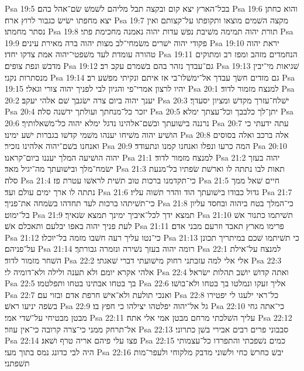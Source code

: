 Psa 19:5  בכל־הארץ יצא קום ובקצה תבל מליהם לשׁמשׁ שׂם־אהל בהם׃
Psa 19:6  והוא כחתן יצא מחפתו ישׂישׂ כגבור לרוץ ארח׃
Psa 19:7  מקצה השׁמים מוצאו ותקופתו על־קצותם ואין נסתר מחמתו׃
Psa 19:8  תורת יהוה תמימה משׁיבת נפשׁ עדות יהוה נאמנה מחכימת פתי׃
Psa 19:9  פקודי יהוה ישׁרים משׂמחי־לב מצות יהוה ברה מאירת עינים׃
Psa 19:10  יראת יהוה טהורה עומדת לעד משׁפטי־יהוה אמת צדקו יחדו׃
Psa 19:11  הנחמדים מזהב ומפז רב ומתוקים מדבשׁ ונפת צופים׃
Psa 19:12  גם־עבדך נזהר בהם בשׁמרם עקב רב׃
Psa 19:13  שׁגיאות מי־יבין מנסתרות נקני׃
Psa 19:14  גם מזדים חשׂך עבדך אל־ימשׁלו־בי אז איתם ונקיתי מפשׁע רב׃
Psa 19:15  יהיו לרצון אמרי־פי והגיון לבי לפניך יהוה צורי וגאלי׃
Psa 20:1  למנצח מזמור לדוד׃
Psa 20:2  יענך יהוה ביום צרה ישׂגבך שׁם אלהי יעקב׃
Psa 20:3  ישׁלח־עזרך מקדשׁ ומציון יסעדך׃
Psa 20:4  יזכר כל־מנחתך ועולתך ידשׁנה סלה׃
Psa 20:5  יתן־לך כלבבך וכל־עצתך ימלא׃
Psa 20:6  נרננה בישׁועתך ובשׁם־אלהינו נדגל ימלא יהוה כל־משׁאלותיך׃
Psa 20:7  עתה ידעתי כי הושׁיע יהוה משׁיחו יענהו משׁמי קדשׁו בגברות ישׁע ימינו׃
Psa 20:8  אלה ברכב ואלה בסוסים ואנחנו בשׁם־יהוה אלהינו נזכיר׃
Psa 20:9  המה כרעו ונפלו ואנחנו קמנו ונתעודד׃
Psa 20:10  יהוה הושׁיעה המלך יעננו ביום־קראנו׃
Psa 21:1  למנצח מזמור לדוד׃
Psa 21:2  יהוה בעזך ישׂמח־מלך ובישׁועתך מה־יגיל מאד׃
Psa 21:3  תאות לבו נתתה לו וארשׁת שׂפתיו בל־מנעת סלה׃
Psa 21:4  כי־תקדמנו ברכות טוב תשׁית לראשׁו עטרת פז׃
Psa 21:5  חיים שׁאל ממך נתתה לו ארך ימים עולם ועד׃
Psa 21:6  גדול כבודו בישׁועתך הוד והדר תשׁוה עליו׃
Psa 21:7  כי־תשׁיתהו ברכות לעד תחדהו בשׂמחה את־פניך׃
Psa 21:8  כי־המלך בטח ביהוה ובחסד עליון בל־ימוט׃
Psa 21:9  תמצא ידך לכל־איביך ימינך תמצא שׂנאיך׃
Psa 21:10  תשׁיתמו כתנור אשׁ לעת פניך יהוה באפו יבלעם ותאכלם אשׁ׃
Psa 21:11  פרימו מארץ תאבד וזרעם מבני אדם׃
Psa 21:12  כי־נטו עליך רעה חשׁבו מזמה בל־יוכלו׃
Psa 21:13  כי תשׁיתמו שׁכם במיתריך תכונן על־פניהם׃
Psa 21:14  רומה יהוה בעזך נשׁירה ונזמרה גבורתך׃
Psa 22:1  למנצח על־אילת השׁחר מזמור לדוד׃
Psa 22:2  אלי אלי למה עזבתני רחוק מישׁועתי דברי שׁאגתי׃
Psa 22:3  אלהי אקרא יומם ולא תענה ולילה ולא־דומיה לי׃
Psa 22:4  ואתה קדושׁ יושׁב תהלות ישׂראל׃
Psa 22:5  בך בטחו אבתינו בטחו ותפלטמו׃
Psa 22:6  אליך זעקו ונמלטו בך בטחו ולא־בושׁו׃
Psa 22:7  ואנכי תולעת ולא־אישׁ חרפת אדם ובזוי עם׃
Psa 22:8  כל־ראי ילעגו לי יפטירו בשׂפה יניעו ראשׁ׃
Psa 22:9  גל אל־יהוה יפלטהו יצילהו כי חפץ בו׃
Psa 22:10  כי־אתה גחי מבטן מבטיחי על־שׁדי אמי׃
Psa 22:11  עליך השׁלכתי מרחם מבטן אמי אלי אתה׃
Psa 22:12  אל־תרחק ממני כי־צרה קרובה כי־אין עוזר׃
Psa 22:13  סבבוני פרים רבים אבירי בשׁן כתרוני׃
Psa 22:14  פצו עלי פיהם אריה טרף ושׁאג׃
Psa 22:15  כמים נשׁפכתי והתפרדו כל־עצמותי היה לבי כדונג נמס בתוך מעי׃
Psa 22:16  יבשׁ כחרשׂ כחי ולשׁוני מדבק מלקוחי ולעפר־מות תשׁפתני׃
